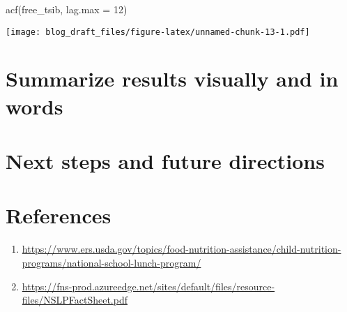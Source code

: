 \documentclass[
]{article}
\newenvironment{Shaded}{\begin{snugshade}}{\end{snugshade}}
\newcommand{\AttributeTok}[1]{\textcolor[rgb]{0.77,0.63,0.00}{#1}}
\newcommand{\DecValTok}[1]{\textcolor[rgb]{0.00,0.00,0.81}{#1}}
\newcommand{\FunctionTok}[1]{\textcolor[rgb]{0.00,0.00,0.00}{#1}}
\newcommand{\NormalTok}[1]{#1}
\providecommand{\tightlist}{%
  \setlength{\itemsep}{0pt}\setlength{\parskip}{0pt}}
\begin{document}
\begin{Shaded}
\begin{Highlighting}[]
\FunctionTok{acf}\NormalTok{(free\_tsib, }\AttributeTok{lag.max =} \DecValTok{12}\NormalTok{)}
\end{Highlighting}
\end{Shaded}

\texttt{[image: blog\_draft\_files/figure-latex/unnamed-chunk-13-1.pdf]}

\hypertarget{summarize-results-visually-and-in-words}{%
\section{Summarize results visually and in
words}\label{summarize-results-visually-and-in-words}}

\hypertarget{next-steps-and-future-directions}{%
\section{Next steps and future
directions}\label{next-steps-and-future-directions}}

\hypertarget{references}{%
\section{References}\label{references}}

\begin{enumerate}
\def\labelenumi{(\arabic{enumi})}
\tightlist
\item
  \url{https://www.ers.usda.gov/topics/food-nutrition-assistance/child-nutrition-programs/national-school-lunch-program/}
\item
  \url{https://fns-prod.azureedge.net/sites/default/files/resource-files/NSLPFactSheet.pdf}
\end{enumerate}
\end{document}
